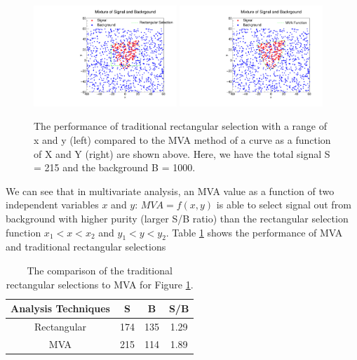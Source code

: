 \begin{figure}[h]
\begin{center}
\includegraphics[width= 0.48\textwidth]{Figures/Chapter4/Rectangular.pdf}
\includegraphics[width= 0.48\textwidth]{Figures/Chapter4/MVA.pdf}
\caption{The performance of traditional rectangular selection with a range of x and y (left) compared to the MVA method of a curve as a function of X and Y (right) are shown above. Here, we have the total signal S = 215 and the background B =  1000.}
\label{MVADemo}
\end{center}
\end{figure}

We can see that in multivariate analysis, an MVA value as a function of two independent variables $x$ and $y$: $MVA = f(x,y)$ is able to select signal out from background with higher purity (larger S/B ratio) than the rectangular selection function $x_1 < x < x_2$ and $y_1 < y < y_2$. Table \ref{MVAvsRec} shows the performance of MVA and traditional rectangular selections

\begin{table}[h]
\begin{center}
\caption{The comparison of the traditional rectangular selections to MVA for Figure \ref{MVADemo}.}
\vspace{1em}
\label{MVAvsRec}
  \begin{tabular}{ |c | c| c| c|}
    \hline 
Analysis Techniques &  S & B & S/B \\
     \hline
Rectangular & 174 & 135 & 1.29  \\
         \hline
MVA &   215  & 114  & 1.89  \\
     \hline
    \hline
\end{tabular}
\end{center}
\end{table}


